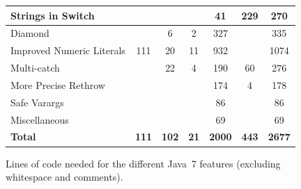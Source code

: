 {\begin{figure}
{{\begin{tabular}{|l|c|c|c|c|c|c|}
    \hline
    Strings in Switch & & & & 41 & 229 & 270 \\

    \hline
    Diamond & & 6 & 2 & 327 & & 335 \\

    \hline
    Improved Numeric Literals & 111 & 20 & 11 & 932 & & 1074 \\

    \hline
    Multi-catch & & 22 & 4 & 190 & 60 & 276 \\

    \hline
    More Precise Rethrow & & & & 174 & 4 & 178 \\

    \hline
    Safe Varargs & & & & 86 & & 86 \\

    \hline
    Miscellaneous & & & & 69 & & 69 \\

    \hline
    \textbf{Total} & \textbf{111}& \textbf{102}& \textbf{21}& \textbf{2000}& \textbf{443} & \textbf{2677}\\
    \hline
\end{tabular}
}
}%
\caption{Lines of code needed for the different Java~7 features (excluding whitespace and comments).}
\label{fig:scope}
\end{figure}


}

